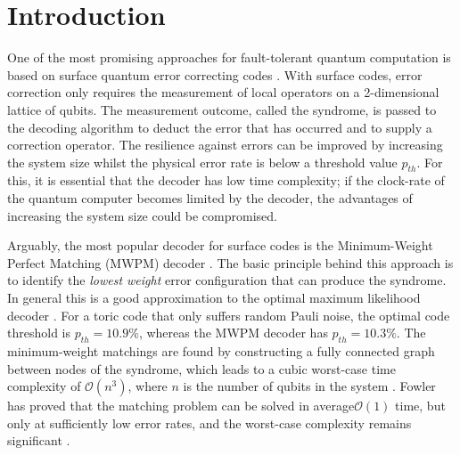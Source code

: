 \section{Introduction}\label{sec:introduction}
One of the most promising approaches for fault-tolerant quantum computation is based on surface quantum error correcting codes \cite{dennis2002topological, kitaev2003fault}. With surface codes, error correction only requires the measurement of local operators on a 2-dimensional lattice of qubits. The measurement outcome, called the syndrome, is passed to the decoding algorithm to deduct the error that has occurred and to supply a correction operator. The resilience against errors can be improved by increasing the system size whilst the physical error rate is below a threshold value $p_{th}$. For this, it is essential that the decoder has low time complexity; if the clock-rate of the quantum computer becomes limited by the decoder, the advantages of increasing the system size could be compromised.

Arguably, the most popular decoder for surface codes is the Minimum-Weight Perfect Matching (MWPM) decoder \cite{dennis2002topological}. The basic principle behind this approach is to identify the \emph{lowest weight} error configuration that can produce the syndrome. In general this is a good approximation to the optimal maximum likelihood decoder \cite{bravyi2014efficient}. For a toric code that only suffers random Pauli noise, the optimal code threshold is $p_{th} = 10.9\%$, whereas the MWPM decoder has $p_{th} = 10.3\%$. The minimum-weight matchings are found by constructing a fully connected graph between nodes of the syndrome, which leads to a cubic worst-case time complexity of $\mathcal{O}(n^3)$, where $n$ is the number of qubits in the system \cite{kolmogorov2009blossom}. Fowler has proved that the matching problem can be solved in average$\mathcal{O}(1)$ time, but only at sufficiently low error rates, and the worst-case complexity remains significant \cite{fowler2013minimum}. 

